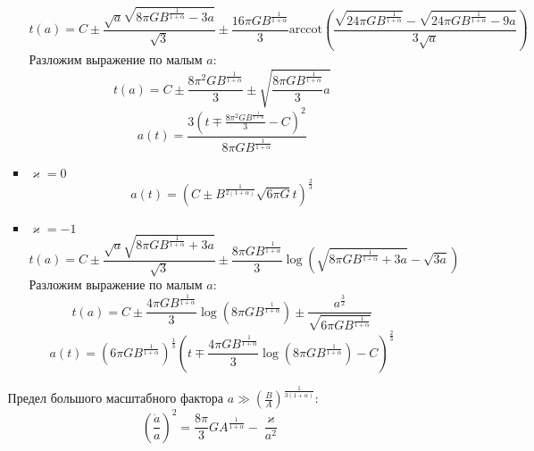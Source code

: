 \documentclass[12pt]{article}
\theoremstyle{definition}
\begin{document}
\begin{enumerate}
\begin{itemize}
\begin{itemize}
            \begin{equation*}
                t(a)=C\pm\frac{\sqrt{a}\sqrt{8\pi GB^\frac{1}{1+\alpha}-3a}}{\sqrt{3}}\pm\frac{16\pi GB^\frac{1}{1+\alpha}}{3}\text{arccot}\left(\frac{\sqrt{24\pi GB^\frac{1}{1+\alpha}}-\sqrt{24\pi GB^\frac{1}{1+\alpha}-9a}}{3\sqrt{a}}\right)
            \end{equation*}
            Разложим выражение по малым $a$:
            \begin{equation}
                t(a)=C\pm\frac{8\pi^2 GB^\frac{1}{1+\alpha}}{3}\pm\sqrt{\frac{8\pi GB^\frac{1}{1+\alpha}}{3}a}
            \end{equation}
            \begin{equation}
                \boxed{a(t)=\frac{3(t\mp\frac{8\pi^2GB^\frac{1}{1+\alpha}}{3}-C)^2}{8\pi GB^\frac{1}{1+\alpha}}}
            \end{equation}
            \item $\varkappa=0$
            \begin{equation}
                \boxed{a(t)=\left(C\pm B^\frac{1}{2(1+\alpha)}\sqrt{6\pi G}t\right)^\frac{2}{3}}
            \end{equation}
            \item $\varkappa=-1$
            \begin{equation}
                t(a)=C\pm\frac{\sqrt{a}\sqrt{8\pi GB^\frac{1}{1+\alpha}+3a}}{\sqrt{3}}\pm\frac{8\pi GB^\frac{1}{1+\alpha}}{3}\log\left(\sqrt{8\pi GB^\frac{1}{1+\alpha}+3a}-\sqrt{3a}\right)
            \end{equation}
            Разложим выражение по малым $a$:
            \begin{equation}
                t(a)=C\pm\frac{4\pi GB^\frac{1}{1+\alpha}}{3}\log\left(8\pi GB^\frac{1}{1+\alpha}\right)\pm\frac{a^\frac{3}{2}}{\sqrt{6\pi GB^\frac{1}{1+\alpha}}}
            \end{equation}
            \begin{equation}
                \boxed{a(t)=(6\pi GB^\frac{1}{1+\alpha})^\frac{1}{3}\left(t\mp\frac{4\pi GB^\frac{1}{1+\alpha}}{3}\log(8\pi GB^\frac{1}{1+\alpha})-C\right)^\frac{2}{3}}
            \end{equation}
        \end{itemize}
        Предел большого масштабного фактора $a\gg\left(\frac{B}{A}\right)^\frac{1}{3(1+\alpha)}$:
        \begin{equation}
            \left(\frac{\dot{a}}{a}\right)^2=\frac{8\pi}{3}GA^\frac{1}{1+\alpha}-\frac{\varkappa}{a^2}

\end{equation}
\end{itemize}
\end{enumerate}
\end{document}
